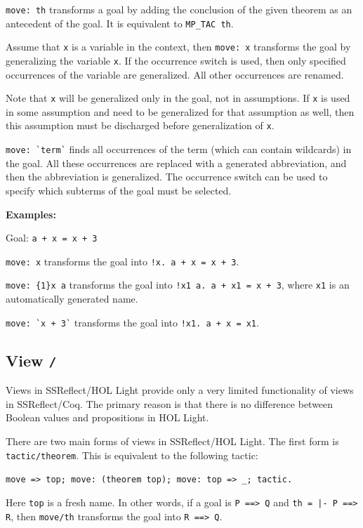 \documentclass[a4paper]{article}
\begin{document}
\verb|move: th| transforms a goal by adding the conclusion of the given theorem as an antecedent of the goal. It is equivalent to \verb|MP_TAC th|.

Assume that \verb|x| is a variable in the context, then \verb|move: x| transforms the goal by generalizing the variable \verb|x|. If the occurrence switch is used, then only specified occurrences of the variable are generalized. All other occurrences are renamed.

Note that \verb|x| will be generalized only in the goal, not in assumptions. If \verb|x| is used in some assumption and need to be generalized for that assumption as well, then this assumption must be discharged before generalization of \verb|x|.

\verb|move: `term`| finds all occurrences of the term (which can contain wildcards) in the goal. All these occurrences are replaced with a generated abbreviation, and then the abbreviation is generalized. The occurrence switch can be used to specify which subterms of the goal must be selected.

{\bf Examples:}

Goal: \verb|a + x = x + 3|

\verb|move: x| transforms the goal into \verb|!x. a + x = x + 3|.

\verb|move: {1}x a| transforms the goal into \verb|!x1 a. a + x1 = x + 3|, where \verb|x1| is an automatically generated name.

\verb|move: `x + 3`| transforms the goal into \verb|!x1. a + x = x1|.



\subsection{View {\tt /}}
Views in SSReflect/HOL Light provide only a very limited functionality of views in SSReflect/Coq. The primary reason is that there is no difference between Boolean values and propositions in HOL Light.

There are two main forms of views in SSReflect/HOL Light. The first form is \verb$tactic/theorem$. This is equivalent to the following tactic: 

\verb|move => top; move: (theorem top); move: top => _; tactic.|

Here \verb|top| is a fresh name. In other words, if a goal is \verb|P ==> Q| and \verb$th = |- P ==> R$, then \verb|move/th| transforms the goal into \verb|R ==> Q|.
\end{document}
